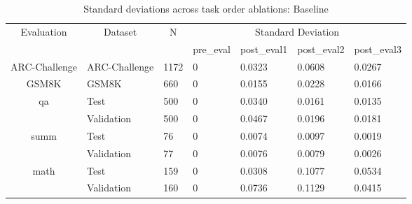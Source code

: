 \begin{table}[H]
\caption{Standard deviations across task order ablations: Baseline}
\begin{tabular}{|c|l|l|llll|}
\hline
\multirow{2}{*}{Evaluation} & \multicolumn{1}{c|}{\multirow{2}{*}{Dataset}} & \multicolumn{1}{c|}{\multirow{2}{*}{N}} & \multicolumn{4}{c|}{Standard   Deviation}                                                                          \\ \cline{4-7} 
                            & \multicolumn{1}{c|}{}                         & \multicolumn{1}{c|}{}                   & \multicolumn{1}{l|}{pre\_eval} & \multicolumn{1}{l|}{post\_eval1} & \multicolumn{1}{l|}{post\_eval2} & post\_eval3 \\ \hline
ARC-Challenge               & ARC-Challenge                                 & 1172                                    & \multicolumn{1}{l|}{0}         & \multicolumn{1}{l|}{0.0323}      & \multicolumn{1}{l|}{0.0608}      & 0.0267      \\ \hline
GSM8K                       & GSM8K                                         & 660                                     & \multicolumn{1}{l|}{0}         & \multicolumn{1}{l|}{0.0155}      & \multicolumn{1}{l|}{0.0228}      & 0.0166      \\ \hline
\multirow{2}{*}{qa}         & Test                                          & 500                                     & \multicolumn{1}{l|}{0}         & \multicolumn{1}{l|}{0.0340}      & \multicolumn{1}{l|}{0.0161}      & 0.0135      \\ \cline{2-7} 
                            & Validation                                    & 500                                     & \multicolumn{1}{l|}{0}         & \multicolumn{1}{l|}{0.0467}      & \multicolumn{1}{l|}{0.0196}      & 0.0181      \\ \hline
\multirow{2}{*}{summ}       & Test                                          & 76                                      & \multicolumn{1}{l|}{0}         & \multicolumn{1}{l|}{0.0074}      & \multicolumn{1}{l|}{0.0097}      & 0.0019      \\ \cline{2-7} 
                            & Validation                                    & 77                                      & \multicolumn{1}{l|}{0}         & \multicolumn{1}{l|}{0.0076}      & \multicolumn{1}{l|}{0.0079}      & 0.0026      \\ \hline
\multirow{2}{*}{math}       & Test                                          & 159                                     & \multicolumn{1}{l|}{0}         & \multicolumn{1}{l|}{0.0308}      & \multicolumn{1}{l|}{0.1077}      & 0.0534      \\ \cline{2-7} 
                            & Validation                                    & 160                                     & \multicolumn{1}{l|}{0}         & \multicolumn{1}{l|}{0.0736}      & \multicolumn{1}{l|}{0.1129}      & 0.0415      \\ \hline
\end{tabular}
\label{TraceBaselineStdDev}
\end{table}

